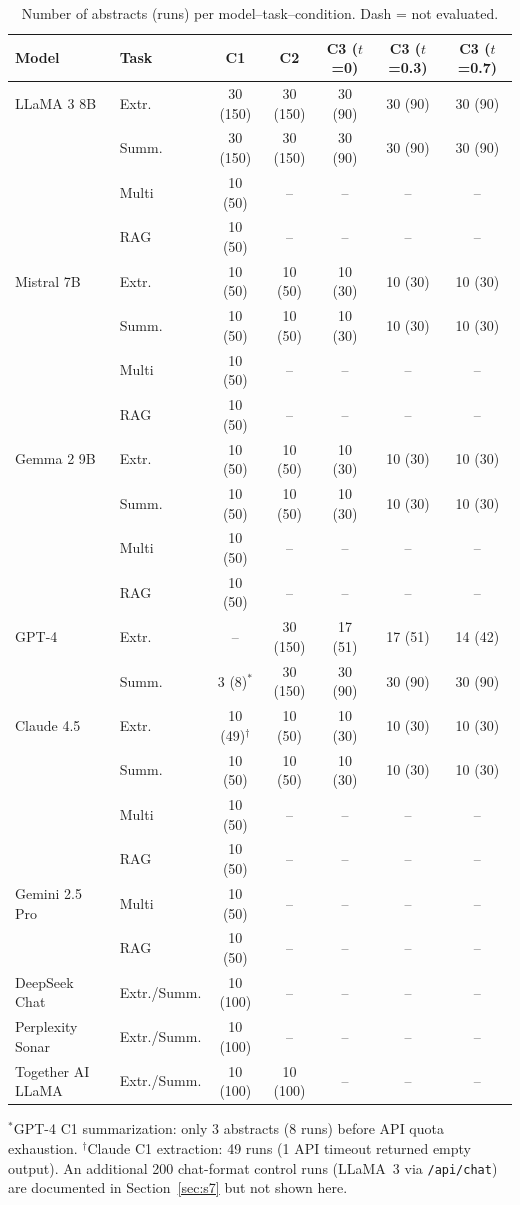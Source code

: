 \documentclass[11pt]{article}
\begin{document}
\begin{table}[H]
\centering
\caption{Number of abstracts (runs) per model--task--condition. Dash = not evaluated.}
\label{tab:coverage}
\small
\begin{tabular}{@{}llccccc@{}}
\toprule
\textbf{Model} & \textbf{Task} & \textbf{C1} & \textbf{C2} & \textbf{C3 ($t$=0)} & \textbf{C3 ($t$=0.3)} & \textbf{C3 ($t$=0.7)} \\
\midrule
LLaMA 3 8B & Extr. & 30 (150) & 30 (150) & 30 (90) & 30 (90) & 30 (90) \\
 & Summ. & 30 (150) & 30 (150) & 30 (90) & 30 (90) & 30 (90) \\
 & Multi & 10 (50) & -- & -- & -- & -- \\
 & RAG & 10 (50) & -- & -- & -- & -- \\
\addlinespace
Mistral 7B & Extr. & 10 (50) & 10 (50) & 10 (30) & 10 (30) & 10 (30) \\
 & Summ. & 10 (50) & 10 (50) & 10 (30) & 10 (30) & 10 (30) \\
 & Multi & 10 (50) & -- & -- & -- & -- \\
 & RAG & 10 (50) & -- & -- & -- & -- \\
\addlinespace
Gemma 2 9B & Extr. & 10 (50) & 10 (50) & 10 (30) & 10 (30) & 10 (30) \\
 & Summ. & 10 (50) & 10 (50) & 10 (30) & 10 (30) & 10 (30) \\
 & Multi & 10 (50) & -- & -- & -- & -- \\
 & RAG & 10 (50) & -- & -- & -- & -- \\
\midrule
GPT-4 & Extr. & -- & 30 (150) & 17 (51) & 17 (51) & 14 (42) \\
 & Summ. & 3 (8)$^*$ & 30 (150) & 30 (90) & 30 (90) & 30 (90) \\
\addlinespace
Claude 4.5 & Extr. & 10 (49)$^\dag$ & 10 (50) & 10 (30) & 10 (30) & 10 (30) \\
 & Summ. & 10 (50) & 10 (50) & 10 (30) & 10 (30) & 10 (30) \\
 & Multi & 10 (50) & -- & -- & -- & -- \\
 & RAG & 10 (50) & -- & -- & -- & -- \\
\addlinespace
Gemini 2.5 Pro & Multi & 10 (50) & -- & -- & -- & -- \\
 & RAG & 10 (50) & -- & -- & -- & -- \\
\addlinespace
DeepSeek Chat & Extr./Summ. & 10 (100) & -- & -- & -- & -- \\
Perplexity Sonar & Extr./Summ. & 10 (100) & -- & -- & -- & -- \\
Together AI LLaMA & Extr./Summ. & 10 (100) & 10 (100) & -- & -- & -- \\
\bottomrule
\end{tabular}
\par\smallskip\raggedright\footnotesize
$^*$GPT-4 C1 summarization: only 3 abstracts (8 runs) before API quota exhaustion.
$^\dag$Claude C1 extraction: 49 runs (1 API timeout returned empty output).
An additional 200 chat-format control runs (LLaMA~3 via \texttt{/api/chat}) are documented in Section~\ref{sec:s7} but not shown here.
\end{table}
\end{document}
